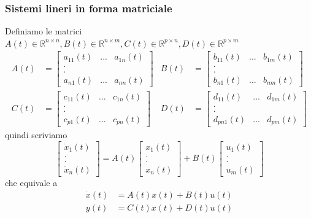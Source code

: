 \documentclass{article}
\begin{document}
\subsubsection{Sistemi lineri in forma matriciale}
Definiamo le matrici $A(t) \in \mathbb{R}^{n \times n} , B(t) \in \mathbb{R}^{n \times m} , C(t) \in \mathbb{R}^{p \times n} , D(t) \in \mathbb{R}^{p \times m}$
\begin{align*}
    A(t) &= \begin{bmatrix}
        a_{11}(t) & ... & a_{1n}(t)\\
        .\\
        .\\
        a_{n1}(t) & ... & a_{nn}(t)
    \end{bmatrix}
    &
    B(t) &= \begin{bmatrix}
        b_{11}(t) & ... & b_{1m}(t)\\
        .\\
        .\\
        b_{n1}(t) & ... & b_{nm}(t)
    \end{bmatrix}\\
    C(t) &= \begin{bmatrix}
        c_{11}(t) & ... & c_{1n}(t)\\
        .\\
        .\\
        c_{p1}(t) & ... & c_{pn}(t)
    \end{bmatrix}
    &
    D(t) &= \begin{bmatrix}
        d_{11}(t) & ... & d_{1m}(t)\\
        .\\
        .\\
        d_{pn1}(t) & ... & d_{pm}(t)
    \end{bmatrix}
\end{align*}
quindi scriviamo
\[
    \begin{bmatrix}
        \dot x_1(t)\\
        .\\
        .\\
        \dot x_n(t)
    \end{bmatrix}
    = A(t)
    \begin{bmatrix}
        x_1(t)\\
        .\\
        .\\
        x_n(t)
    \end{bmatrix}
    + B(t)
    \begin{bmatrix}
        u_1(t)\\
        .\\
        .\\
        u_m(t)
    \end{bmatrix}
\]
che equivale a 
\begin{align*}
    \dot x(t) &= A(t) x(t) + B(t) u(t)\\
    y(t) &= C(t)x(t) + D(t) u(t)
\end{align*}
\end{document}
